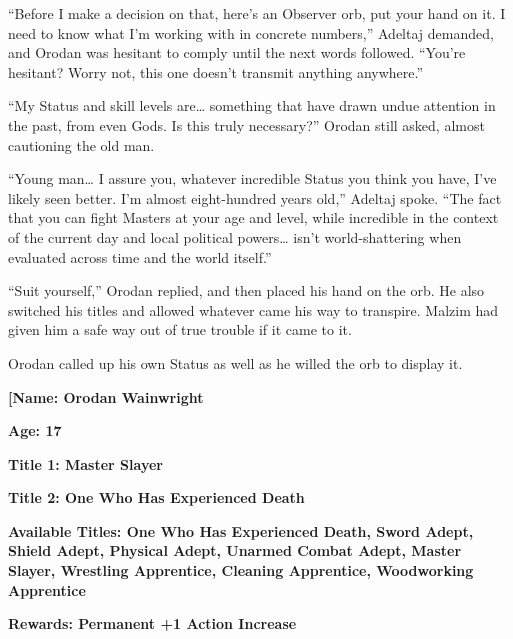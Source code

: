 \documentclass[a4paper,10pt]{book}
\begin{document}
“Before I make a decision on that, here’s an Observer orb, put your hand on it. I need to know what I’m working with in concrete numbers,” Adeltaj demanded, and Orodan was hesitant to comply until the next words followed. “You’re hesitant? Worry not, this one doesn’t transmit anything anywhere.”\par
“My Status and skill levels are… something that have drawn undue attention in the past, from even Gods. Is this truly necessary?” Orodan still asked, almost cautioning the old man.\par
“Young man… I assure you, whatever incredible Status you think you have, I’ve likely seen better. I’m almost eight-hundred years old,” Adeltaj spoke. “The fact that you can fight Masters at your age and level, while incredible in the context of the current day and local political powers… isn’t world-shattering when evaluated across time and the world itself.”\par
“Suit yourself,” Orodan replied, and then placed his hand on the orb. He also switched his titles and allowed whatever came his way to transpire. Malzim had given him a safe way out of true trouble if it came to it.\par
Orodan called up his own Status as well as he willed the orb to display it.\par
\textbf{[Name: Orodan Wainwright}\par
\textbf{Age: 17}\par
\textbf{Title 1: Master Slayer}\par
\textbf{Title 2: One Who Has Experienced Death}\par
\textbf{Available Titles: One Who Has Experienced Death, Sword Adept, Shield Adept, Physical Adept, Unarmed Combat Adept, Master Slayer, Wrestling Apprentice, Cleaning Apprentice, Woodworking Apprentice}\par
\textbf{Rewards: Permanent +1 Action Increase}\par
\end{document}
